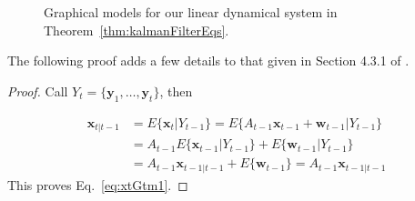 \documentclass[12pt]{article}
\begin{document}
\begin{figure}
    \centering
    
    \caption{Graphical models for our linear dynamical system in
    Theorem~\ref{thm:kalmanFilterEqs}.}
    \label{fig:ldsModel}
\end{figure}

The following proof adds a few details to that given in Section 4.3.1 of
\citet{durbinAndKoopman12}.

\begin{proof}
    Call $Y_t=\{\mathbf{y}_1,\ldots,\mathbf{y}_t\}$, then

    \begin{align}
        \mathbf{x}_{t|t-1}&=E\{\mathbf{x}_t|Y_{t-1}\}=E\{A_{t-1}\mathbf{x}_{t-1}+\mathbf{w}_{t-1}|Y_{t-1}\}\nonumber\\
                          &=A_{t-1}E\{\mathbf{x}_{t-1}|Y_{t-1}\}+E\{\mathbf{w}_{t-1}|Y_{t-1}\}\nonumber\\
                          &=A_{t-1}\mathbf{x}_{t-1|t-1}+E\{\mathbf{w}_{t-1}\}=A_{t-1}\mathbf{x}_{t-1|t-1}\label{eq:p1n1}
    \end{align}
	This proves Eq.~\ref{eq:xtGtm1}.


\end{proof}
\end{document}
